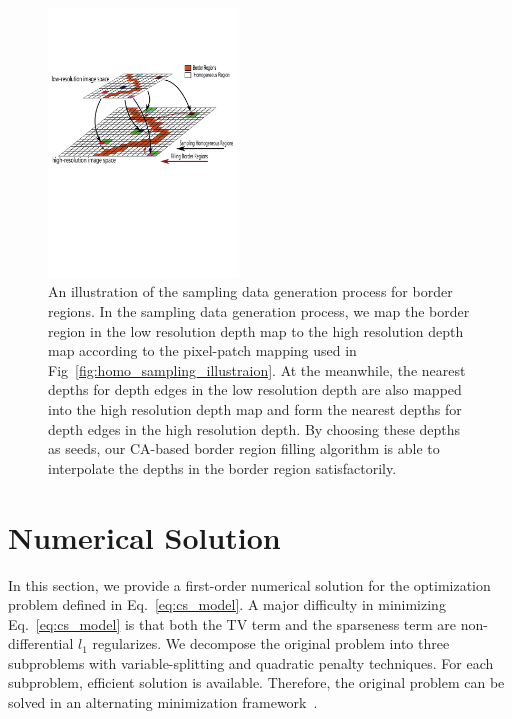 \documentclass[preprint,10pt,5p,times,twocolumn]{elsarticle}
\begin{document}
\begin{figure}[t]
\centering
\includegraphics[width=0.45\textwidth]{fig_sampling_illustration.pdf}
\caption{An illustration of the sampling data generation process for border regions. In the sampling data generation process, we map the border region in the low resolution depth map to the high resolution depth map according to the pixel-patch mapping used in Fig~\ref{fig:homo_sampling_illustraion}. At the meanwhile, the nearest depths for depth edges in the low resolution depth are also mapped into the high resolution depth map and form the nearest depths for depth edges in the high resolution depth. By choosing these depths as seeds, our CA-based border region filling algorithm is able to interpolate the depths in the border region satisfactorily.}
\label{fig:sampling_illustraion}
\end{figure}

\section{Numerical Solution}
\label{chap:numericalsolution}
In this section, we provide a first-order numerical solution for the optimization problem defined in Eq.~\eqref{eq:cs_model}. A major difficulty in minimizing Eq.~\eqref{eq:cs_model} is that both the TV term and the sparseness term are non-differential $l_{1}$ regularizes. We decompose the original problem into three subproblems with variable-splitting and quadratic penalty techniques. For each subproblem, efficient solution is available. Therefore, the original problem can be solved in an alternating minimization framework~\cite{WYYZ08}.
\end{document}
